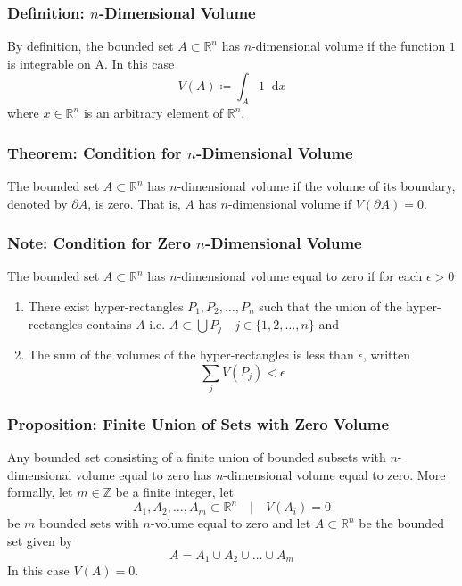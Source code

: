 \documentclass[11pt, a4paper]{article}
\newcommand{\diff}{\mathop{}\!\mathrm{d}} %
\begin{document}
\subsubsection{Definition: $ n $-Dimensional Volume}
By definition, the bounded set $ A \subset \mathbb{R}^n $ has $ n $-dimensional volume if the function $ 1 $ is integrable on A. In this case
\begin{equation*}
	V(A) \coloneqq \int_A 1 \diff x
\end{equation*}
where $ x \in \mathbb{R}^n $ is an arbitrary element of $ \mathbb{R}^n $.

\subsubsection{Theorem: Condition for $ n $-Dimensional Volume}
The bounded set $ A \subset \mathbb{R}^n $ has $ n $-dimensional volume if the volume of its boundary, denoted by $ \partial A$, is zero. That is, $ A $ has $ n $-dimensional volume if $ V(\partial A) = 0 $.

\subsubsection{Note: Condition for Zero $ n $-Dimensional Volume}
The bounded set $ A \subset \mathbb{R}^n $ has $ n $-dimensional volume equal to zero if for each $ \epsilon > 0 $ 
\begin{enumerate}
	\item There exist hyper-rectangles $ P_1, P_2, \dots, P_n $ such that the union of the hyper-rectangles contains $ A $ i.e. $ A \subset \bigcup P_j \quad j \in \{1, 2, \dots, n\} $ and
	\item The sum of the volumes of the hyper-rectangles is less than $\epsilon$, written
	\begin{equation*}
		\sum_j V(P_j) < \epsilon
	\end{equation*}
\end{enumerate} 

\subsubsection{Proposition: Finite Union of Sets with Zero Volume}
Any bounded set consisting of a finite union of bounded subsets with $ n $-dimensional volume equal to zero has $ n $-dimensional volume equal to zero. More formally, let $ m \in \mathbb{Z} $ be a finite integer, let
\begin{equation*}
 A_1, A_2, \dots, A_m \subset \mathbb{R}^n \quad | \quad V(A_i) = 0
\end{equation*}
be $ m $ bounded sets with $ n $-volume equal to zero and let $ A \subset \mathbb{R}^n $ be the bounded set given by 
\begin{equation*}
	A = A_1 \cup A_2 \cup \dots \cup A_m 
\end{equation*}
In this case $ V(A) = 0 $.
\end{document}

